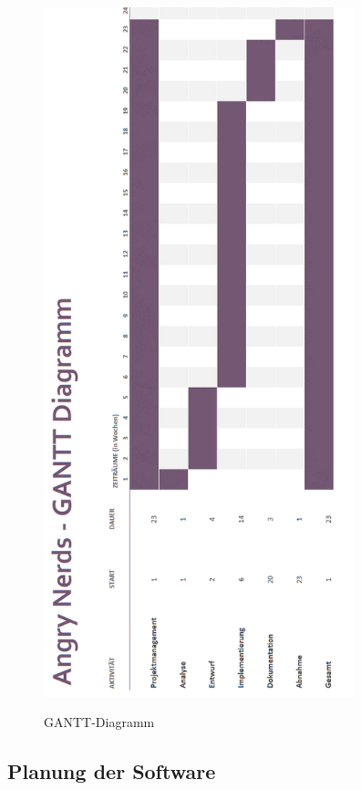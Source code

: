 \begin{figure}[H]
\centering
\begin{minipage}[t]{1\textwidth} %
\caption{GANTT-Diagramm} %
\includegraphics[width=9cm]{img/GANTT}\\ %
\end{minipage}
\end{figure}

\newpage
\subsection{Planung der Software}
